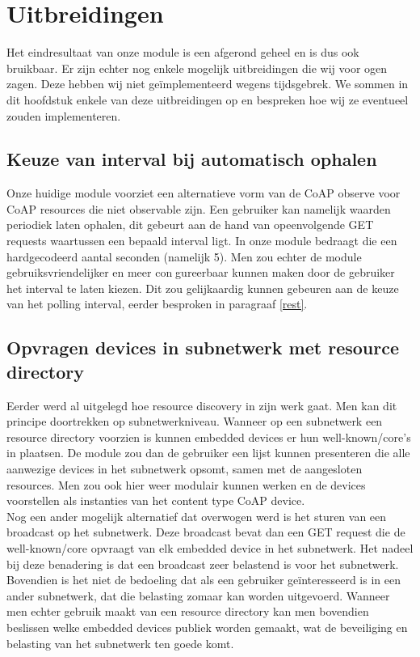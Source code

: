 \chapter{Uitbreidingen} \label{uitbreidingen}

Het eindresultaat van onze module is een afgerond geheel en is dus ook bruikbaar. Er zijn echter nog enkele mogelijk uitbreidingen die wij voor ogen zagen. Deze hebben wij niet ge\"{i}mplementeerd wegens tijdsgebrek. We sommen in dit hoofdstuk enkele van deze uitbreidingen op en bespreken hoe wij ze eventueel zouden implementeren.

\section{Keuze van interval bij automatisch ophalen}
Onze huidige module voorziet een alternatieve vorm van de CoAP observe voor CoAP resources die niet observable zijn. Een gebruiker kan namelijk waarden periodiek laten ophalen, dit gebeurt
aan de hand van opeenvolgende GET requests waartussen een bepaald interval ligt. In onze module bedraagt die een hardgecodeerd aantal seconden (namelijk 5). Men zou echter de module
gebruiksvriendelijker en meer congureerbaar kunnen maken door de gebruiker het interval te laten kiezen. Dit zou gelijkaardig kunnen gebeuren aan de keuze van het polling interval, eerder
besproken in paragraaf \ref{rest}.

\section{Opvragen devices in subnetwerk met resource directory} \label{resourceDirectory}
Eerder werd al uitgelegd hoe resource discovery in zijn werk gaat. Men kan dit principe doortrekken op subnetwerkniveau. Wanneer op een subnetwerk een resource directory voorzien is
kunnen embedded devices er hun well-known/core's in plaatsen. De module zou dan de gebruiker een lijst kunnen presenteren die alle aanwezige devices in het subnetwerk opsomt, samen
met de aangesloten resources. Men zou ook hier weer modulair kunnen werken en de devices voorstellen als instanties van het content type CoAP device.\\

Nog een ander mogelijk alternatief dat overwogen werd is het sturen van een broadcast op het subnetwerk. Deze broadcast bevat dan een GET request die de well-known/core opvraagt
van elk embedded device in het subnetwerk. Het nadeel bij deze benadering is dat een broadcast zeer belastend is voor het subnetwerk. Bovendien is het niet de bedoeling dat als een gebruiker
ge\"{i}nteresseerd is in een ander subnetwerk, dat die belasting zomaar kan worden uitgevoerd. Wanneer men echter gebruik maakt van een resource directory kan men bovendien beslissen welke
embedded devices publiek worden gemaakt, wat de beveiliging en belasting van het subnetwerk ten goede komt.

